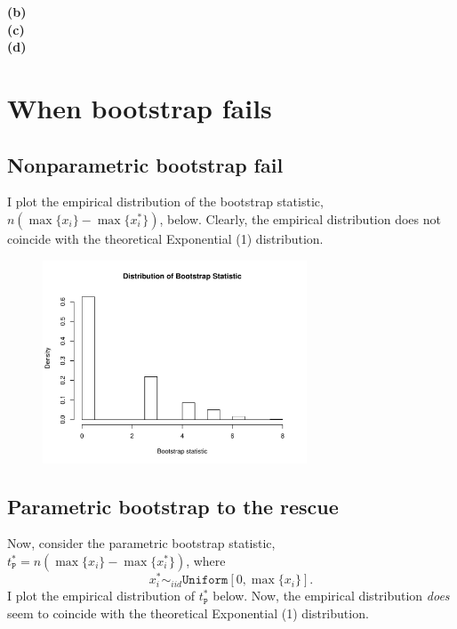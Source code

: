 \documentclass[12pt]{article}
\begin{document}
\textbf{(b)}\\

\textbf{(c)}\\

\textbf{(d)}




\newpage

\section{When bootstrap fails}

\subsection{Nonparametric bootstrap fail}
I plot the empirical distribution of the bootstrap statistic, $n(\max\{x_i\} - \max\{x_i^*\})$, below. Clearly, the empirical distribution does not coincide with the theoretical Exponential (1) distribution.

\begin{figure}[!htpb]
    \centering
    
        \includegraphics[width=0.7\textwidth]{freq.pdf}

\end{figure}

\subsection{Parametric bootstrap to the rescue}
Now, consider the parametric bootstrap statistic, $t^*_{\texttt{P}}= n(\max\{x_i\} - \max\{x_i^*\})$, where $$x_i^* \sim_{iid} \texttt{Uniform}[0,\max\{x_i\}].$$ I plot the empirical distribution of $t^*_{\texttt{P}}$ below. Now, the empirical distribution \textit{does} seem to coincide with the theoretical Exponential (1) distribution.
\end{document}
